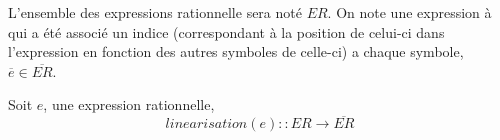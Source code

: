 \documentclass{article}
\begin{document}
L'ensemble des expressions rationnelle sera noté \(ER\). On note une expression 
à qui a été associé un indice (correspondant à la position de celui-ci dans 
l'expression en fonction des autres symboles de celle-ci) a chaque symbole, 
\(\overline{e} \in \overline{ER}\).

\vphantom{}

Soit \(e\), une expression rationnelle,
\[
  linearisation(e) :: ER \to \overline{ER}
\]
\end{document}
